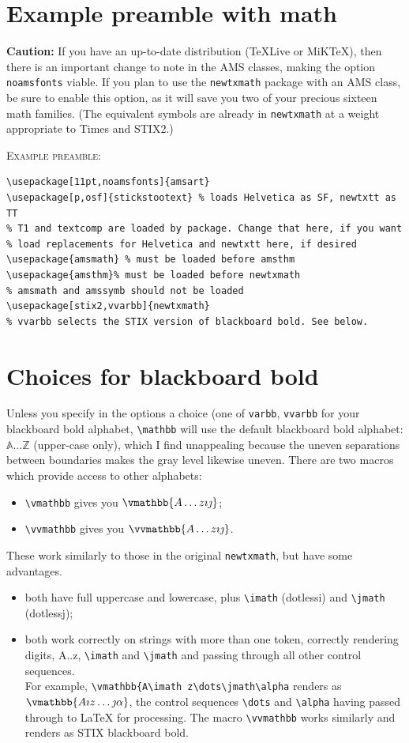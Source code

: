\documentclass[11pt]{article}
\begin{document}
\section{Example preamble with math}
\textbf{Caution:} If you have an up-to-date distribution (TeXLive or MiKTeX), then there is an important change to note in the AMS classes, making the option {\tt noamsfonts} viable. If you plan to use the {\tt newtxmath} package with an AMS class, be sure to enable this option, as it will save you two of your precious sixteen math families. (The equivalent symbols are already in {\tt newtxmath} at a weight appropriate to Times and STIX2.)

\textsc{Example preamble:}
\begin{verbatim}
\usepackage[11pt,noamsfonts]{amsart}
\usepackage[p,osf]{stickstootext} % loads Helvetica as SF, newtxtt as TT
% T1 and textcomp are loaded by package. Change that here, if you want
% load replacements for Helvetica and newtxtt here, if desired
\usepackage{amsmath} % must be loaded before amsthm
\usepackage{amsthm}% must be loaded before newtxmath
% amsmath and amssymb should not be loaded
\usepackage[stix2,vvarbb]{newtxmath}
% vvarbb selects the STIX version of blackboard bold. See below.
\end{verbatim}
\section{Choices for blackboard bold}
Unless you specify in the options a choice (one of {\tt varbb}, {\tt vvarbb} for your blackboard bold alphabet, \verb|\mathbb| will use the default blackboard bold alphabet: $\mathbb{A\dots Z}$ (upper-case only), which I find unappealing because the uneven separations between boundaries makes the gray level likewise uneven. There are  two macros which provide access to other alphabets: 
\begin{itemize}
\item
\verb|\vmathbb| gives you $\vmathbb{A\dots z\imath\jmath}$;
\item \verb|\vvmathbb| gives you $\vvmathbb{A\dots z\imath\jmath}$.\end{itemize}
These work similarly to those in the original {\tt newtxmath}, but have some advantages.
\begin{itemize}
\item
both have full uppercase and lowercase, plus \verb|\imath| (dotlessi) and \verb|\jmath| (dotlessj);
\item both work correctly on strings with more than one token, correctly rendering digits, A..z, \verb|\imath| and \verb|\jmath| and passing through all other control sequences. \\
For example, \verb|\vmathbb{A\imath z\dots\jmath\alpha| renders as $\vmathbb{A\imath z\dots\jmath\alpha}$, the control sequences \verb|\dots| and \verb|\alpha| having passed through to LaTeX for processing. The macro \verb|\vvmathbb| works similarly and renders as STIX blackboard bold.
\end{itemize}
\end{document}

